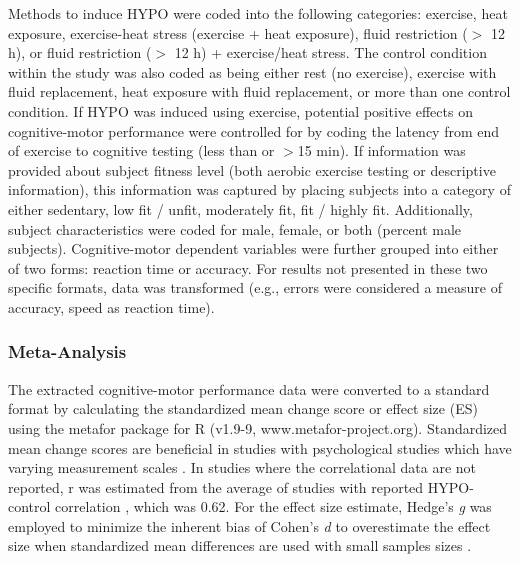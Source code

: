Methods to induce HYPO were coded into the following categories: exercise, heat exposure, exercise-heat stress (exercise + heat exposure), fluid restriction (${>}$ 12 h), or fluid restriction (${>}$ 12 h) + exercise/heat stress. The control condition within the study was also coded as being either rest (no exercise), exercise with fluid replacement, heat exposure with fluid replacement, or more than one control condition. If HYPO was induced using exercise, potential positive effects on cognitive-motor performance \cite{chang_effects_2012} were controlled for by coding the latency from end of exercise to cognitive testing (less than or $>$15 min). If information was provided about subject fitness level (both aerobic exercise testing or descriptive information), this information was captured by placing subjects into a category of either sedentary, low fit / unfit, moderately fit, fit / highly fit. Additionally, subject characteristics were coded for male, female, or both (percent male subjects). Cognitive-motor dependent variables were further grouped into either of two forms: reaction time or accuracy. For results not presented in these two specific formats, data was transformed (e.g., errors were considered a measure of accuracy, speed as reaction time).       

\subsubsection{Meta-Analysis}
The extracted cognitive-motor performance data were converted to a standard format by calculating the standardized mean change score or effect size (ES) using the metafor package for R (v1.9-9, www.metafor-project.org). Standardized mean change scores are beneficial in studies with psychological studies which have varying measurement scales \cite{morris_combining_2002,borenstein_introduction_2009}. In studies where the correlational data are not reported, r was estimated from the average of studies with reported HYPO-control correlation \cite{wittbrodt_fluid_2015,watson_mild_2015}, which was 0.62. For the effect size estimate, Hedge’s \textit{g} was employed to minimize the inherent bias of Cohen’s \textit{d} to overestimate the effect size when standardized mean differences are used with small samples sizes \cite{borenstein_introduction_2009}.   

